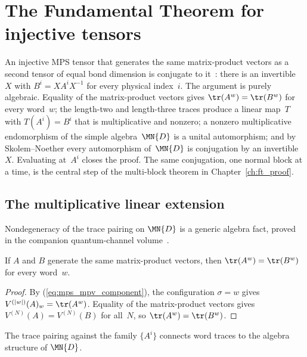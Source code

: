 \chapter{The Fundamental Theorem for injective tensors}\label{ch:single}

An injective MPS tensor that generates the same matrix-product vectors as a
second tensor of equal bond dimension is conjugate to
it~\cite[Corollary~IV.5]{Cirac2021Matrix}: there is an invertible~$X$ with
$B^i = X A^i X^{-1}$ for every physical index~$i$. The argument is purely
algebraic. Equality of the matrix-product vectors gives $\tr(A^w)=\tr(B^w)$ for
every word~$w$; the length-two and length-three traces produce a linear map~$T$
with $T(A^i)=B^i$ that is multiplicative and nonzero; a nonzero multiplicative
endomorphism of the simple algebra~$\MN{D}$ is a unital automorphism; and by
Skolem--Noether every automorphism of~$\MN{D}$ is conjugation by an
invertible~$X$. Evaluating at~$A^i$ closes the proof. The same conjugation, one
normal block at a time, is the central step of the multi-block theorem in
Chapter~\ref{ch:ft_proof}.

\section{The multiplicative linear extension}

Nondegeneracy of the trace pairing on $\MN{D}$ is a generic algebra fact,
proved in the companion quantum-channel volume~\cite[``Nondegeneracy of the trace pairing'']{QICLean2026Blueprint}.

\begin{lemma}\label{lem:same_mpv_trace}
    \leanok
    If $A$ and $B$ generate the same matrix-product vectors, then
    $\tr(A^w) = \tr(B^w)$ for every word~$w$.
\end{lemma}

\begin{proof}
    \leanok
    By (\ref{eq:mps_mpv_component}), the configuration $\sigma = w$ gives
    $V^{(|w|)}(A)_w = \tr(A^w)$. Equality of the matrix-product vectors gives
    $V^{(N)}(A) = V^{(N)}(B)$ for all~$N$, so
    $\tr(A^w) = \tr(B^w)$.
\end{proof}

The trace pairing against the family $\{A^i\}$ connects word traces to the
algebra structure of $\MN{D}$.

